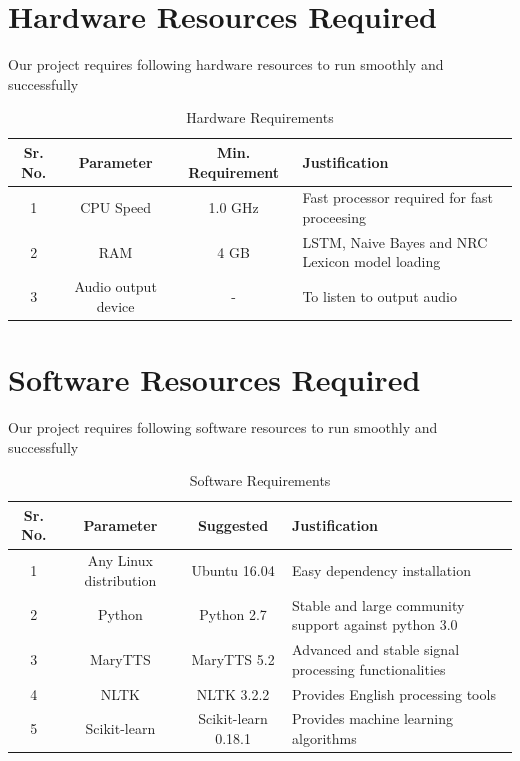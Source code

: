 \documentclass[oneside,a4paper,12pt]{book}
\begin{document}
\newpage
\section{Hardware Resources Required}
Our project requires following hardware resources to run smoothly and successfully 
\begin{table}[!htbp]
	\begin{center}
		\def\arraystretch{1.5}
		\begin{tabularx}{\textwidth}{| c | c | c | X |}
			\hline
			Sr. No. &	Parameter &	Min. Requirement & Justification \\
			\hline
			1 &	CPU Speed &	 1.0 GHz  & Fast processor required for fast proceesing\\
			\hline
			2 &	RAM  &	4 GB &  LSTM, Naive Bayes and NRC Lexicon model loading\\
			\hline
			3 & Audio output device & - & To listen to output audio\\
			\hline
		\end{tabularx}
		\caption { Hardware Requirements }
		\label{tab:hreq}
	\end{center}
	
\end{table}

\newpage
\section{Software Resources Required}
Our project requires following software resources to run smoothly and successfully
\begin{table}[!htbp]
	\begin{center}
		\def\arraystretch{1.5}
		\begin{tabularx}{\textwidth}{| c | c | c | X |}
			\hline
			Sr. No. &	Parameter &	Suggested & Justification \\
			\hline
			1 &	Any Linux distribution &	 Ubuntu 16.04  & Easy dependency installation\\
			\hline
			2 &	Python  &	Python 2.7 & Stable and large community support against python 3.0\\
			\hline
			3 & MaryTTS & MaryTTS 5.2 & Advanced and stable signal processing functionalities\\
			\hline
			4 & NLTK & NLTK 3.2.2 & Provides English processing tools\\
			\hline
			5 & Scikit-learn & Scikit-learn 0.18.1 & Provides machine learning algorithms\\
			\hline
		\end{tabularx}
		\caption { Software Requirements }
		\label{tab:sreq}
	\end{center}
	
\end{table}
\end{document}
